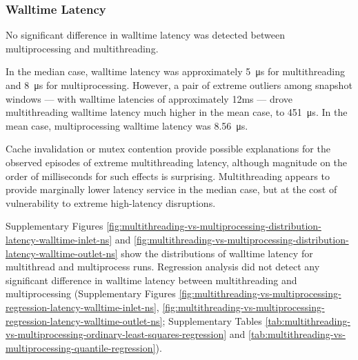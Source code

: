 \subsubsection{Walltime Latency}

No significant difference in walltime latency was detected between multiprocessing and multithreading.

In the median case, walltime latency was approximately \SI{5}{\micro\second} for multithreading and \SI{8}{\micro\second} for multiprocessing.
However, a pair of extreme outliers among snapshot windows --- with walltime latencies of approximately 12ms --- drove multithreading walltime latency much higher in the mean case, to \SI{451}{\micro\second}.
In the mean case, multiprocessing walltime latency was \SI{8.56}{\micro\second}.

Cache invalidation or mutex contention provide possible explanations for the observed episodes of extreme multithreading latency, although magnitude on the order of milliseconds for such effects is surprising.
Multithreading appears to provide marginally lower latency service in the median case, but at the cost of vulnerability to extreme high-latency disruptions.

Supplementary Figures \ref{fig:multithreading-vs-multiprocessing-distribution-latency-walltime-inlet-ns} and \ref{fig:multithreading-vs-multiprocessing-distribution-latency-walltime-outlet-ns} show the distributions of walltime latency for multithread and multiprocess runs.
Regression analysis did not detect any significant difference in walltime latency between multithreading and multiprocessing (Supplementary Figures \ref{fig:multithreading-vs-multiprocessing-regression-latency-walltime-inlet-ns}, \ref{fig:multithreading-vs-multiprocessing-regression-latency-walltime-outlet-ns}; Supplementary Tables \ref{tab:multithreading-vs-multiprocessing-ordinary-least-squares-regression} and \ref{tab:multithreading-vs-multiprocessing-quantile-regression}).

